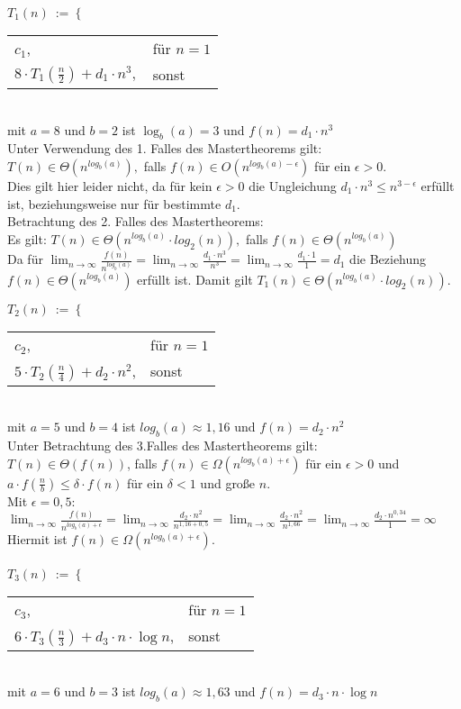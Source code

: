 $T_1(n)\ :=\ \bigg\{$
\begin{tabular}{ll}
$c_1$,&für $n = 1$\\
$8 \cdot T_1(\frac{n}{2}) + d_1 \cdot n^3,$ &sonst
\end{tabular}\\
mit $a = 8$ und $b = 2$ ist $\log_b(a) = 3$ und $f(n) = d_1 \cdot n^3$\\
Unter Verwendung des 1. Falles des Mastertheorems gilt:\\
$T(n) \in  \Theta(n^{log_b(a)}),$ falls $f(n) \in O(n^{log_b(a) - \epsilon})$ für ein $\epsilon > 0$.\\
Dies gilt hier leider nicht, da für kein $\epsilon > 0$ die Ungleichung $d_1 \cdot n^3 \leq n^{3 - \epsilon}$ erfüllt ist, beziehungsweise nur für bestimmte $d_1$.\\
Betrachtung des 2. Falles des Mastertheorems:\\
Es gilt: $T(n) \in  \Theta(n^{log_b(a)}\cdot log_2(n)),$ falls $f(n) \in \Theta(n^{log_b(a)})$\\
Da für $\lim_{n\to\infty}\frac{f(n)}{n^{log_b(a)}} = \lim_{n\to\infty}\frac{d_1\cdot n^3}{n^{3}} = \lim_{n\to\infty}\frac{d_1\cdot 1}{1} = d_1$ die Beziehung $f(n) \in \Theta(n^{log_b(a)})$ erfüllt ist. Damit gilt $T_1(n) \in \Theta(n^{log_b(a)}\cdot log_2(n))$.

$T_2(n)\ :=\ \bigg\{$
\begin{tabular}{ll}
$c_2$,&für $n = 1$\\
$5 \cdot T_2(\frac{n}{4}) + d_2 \cdot n^2$,&sonst
\end{tabular}\\
mit $a=5$ und $b=4$ ist $log_b(a) \approx 1,16$ und $f(n) = d_2 \cdot n^2$\\
Unter Betrachtung des 3.Falles des Mastertheorems gilt:\\
$T(n) \in \Theta(f(n))$, falls $f(n)\in \Omega(n^{log_b(a)+\epsilon})$ für ein $\epsilon > 0$ und $a \cdot f(\frac{n}{b})\leq \delta \cdot f(n)$ für ein $\delta < 1$ und große $n$.\\
Mit $\epsilon = 0,5$:\\
$\lim_{n\to\infty}\frac{f(n)}{n^{log_b(a)+\epsilon}} = \lim_{n\to\infty}\frac{d_2\cdot n^2}{n^{1,16 + 0,5}} = \lim_{n\to\infty}\frac{d_2\cdot n^2}{n^{1,66}} = \lim_{n\to\infty}\frac{d_2\cdot n^{0,34}}{1} = \infty$\\
Hiermit ist $f(n) \in \Omega(n^{log_b(a) + \epsilon})$.\\\\
$T_3(n)\ :=\ \bigg\{$
\begin{tabular}{ll}
$c_3$,&für $n = 1$\\
$6 \cdot T_3(\frac{n}{3}) + d_3 \cdot n \cdot \log n$,&sonst
\end{tabular}\\
mit $a = 6$ und $b = 3$ ist $log_b(a) \approx 1,63$ und $f(n) = d_3 \cdot n \cdot \log n$\\

